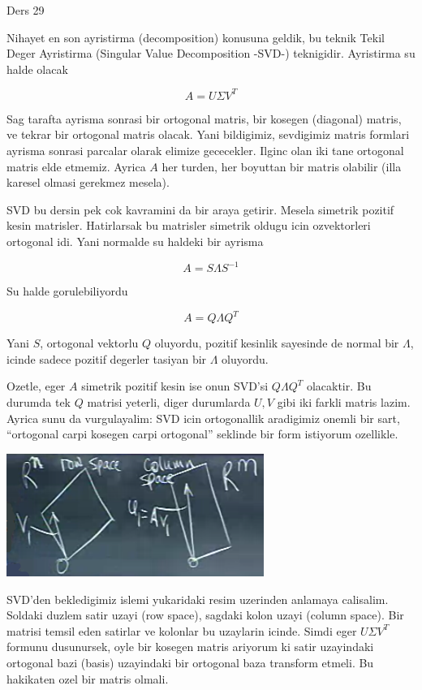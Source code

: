 \documentclass[12pt,fleqn]{article}\usepackage{../common}
\begin{document}
Ders 29

Nihayet en son ayristirma (decomposition) konusuna geldik, bu teknik Tekil
Deger Ayristirma (Singular Value Decomposition -SVD-)
teknigidir. Ayristirma su halde olacak

\[ A = U \Sigma V^T \]

Sag tarafta ayrisma sonrasi bir ortogonal matris, bir kosegen (diagonal)
matris, ve tekrar bir ortogonal matris olacak. Yani bildigimiz, sevdigimiz
matris formlari ayrisma sonrasi parcalar olarak elimize gececekler. Ilginc
olan iki tane ortogonal matris elde etmemiz. Ayrica $A$ her turden, her
boyuttan bir matris olabilir (illa karesel olmasi gerekmez mesela).

SVD bu dersin pek cok kavramini da bir araya getirir. Mesela simetrik
pozitif kesin matrisler. Hatirlarsak bu matrisler simetrik oldugu icin
ozvektorleri ortogonal idi. Yani normalde su haldeki bir ayrisma

\[ A = S \Lambda S ^{-1}   \]

Su halde gorulebiliyordu

\[ A = Q \Lambda Q ^{T}   \]

Yani $S$, ortogonal vektorlu $Q$ oluyordu, pozitif kesinlik sayesinde de
normal bir $\Lambda$, icinde sadece pozitif degerler tasiyan bir  $\Lambda$
oluyordu. 

Ozetle, eger $A$ simetrik pozitif kesin ise onun SVD'si $Q \Lambda Q ^{T}$
olacaktir. Bu durumda tek $Q$ matrisi yeterli, diger durumlarda $U,V$ gibi
iki farkli matris lazim. Ayrica sunu da vurgulayalim: SVD icin ortogonallik
aradigimiz onemli bir sart, ``ortogonal carpi kosegen carpi ortogonal''
seklinde bir form istiyorum ozellikle. 

\includegraphics[height=4cm]{29_1.png}

SVD'den bekledigimiz islemi yukaridaki resim uzerinden anlamaya
calisalim. Soldaki duzlem satir uzayi (row space), sagdaki kolon uzayi
(column space). Bir matrisi temsil eden satirlar ve kolonlar bu uzaylarin
icinde. Simdi eger $U \Sigma V^T$ formunu dusunursek, oyle bir kosegen
matris ariyorum ki satir uzayindaki ortogonal bazi (basis) uzayindaki bir
ortogonal baza transform etmeli. Bu hakikaten ozel bir matris olmali.
\end{document}

